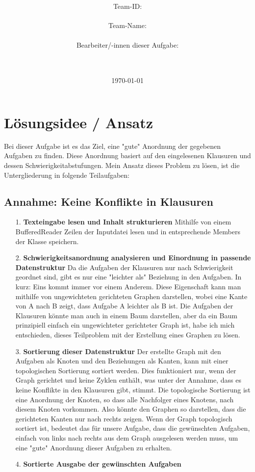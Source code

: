 \documentclass[a4paper,10pt,ngerman]{scrartcl}
\title{\textbf{\Huge\Aufgabe}}
\author{\LARGE Team-ID: \LARGE \TeamId \\\\
	    \LARGE Team-Name: \LARGE \TeamName \\\\
	    \LARGE Bearbeiter/-innen dieser Aufgabe: \\ 
	    \LARGE \Namen\\\\}
\date{\LARGE\today}
\begin{document}
\maketitle
\tableofcontents

\vspace{0.5cm}

\section{Lösungsidee / Ansatz}

Bei dieser Aufgabe ist es das Ziel, eine "gute" Anordnung der gegebenen Aufgaben zu finden. Diese Anordnung basiert auf den eingelesenen
Klausuren und dessen Schwierigkeitabstufungen. Mein Ansatz dieses Problem zu lösen, ist die Untergliederung in folgende Teilaufgaben:

\subsection{Annahme: Keine Konflikte in Klausuren}

\begin{itemize}
  \item[1.] \textbf{Texteingabe lesen und Inhalt strukturieren}
  \newline
  Mithilfe von einem BufferedReader Zeilen der Inputdatei lesen und in entsprechende Members der Klasse speichern.
  \item[2.] \textbf{Schwierigkeitsanordnung analysieren und Einordnung in passende Datenstruktur}
  \newline
  Da die Aufgaben der Klausuren nur nach Schwierigkeit geordnet sind, gibt es nur eine "leichter als" Beziehung in den Aufgaben. In kurz: Eins kommt immer vor einem Anderem.
  Diese Eigenschaft kann man mithilfe von ungewichteten gerichteten Graphen darstellen, wobei eine Kante von A nach B zeigt, dass Aufgabe A leichter als B ist. Die Aufgaben der Klausuren könnte man auch in einem 
  Baum darstellen, aber da ein Baum prinzipiell einfach ein ungewichteter gerichteter Graph ist, habe ich mich entschieden, dieses Teilproblem mit der Erstellung eines Graphen zu lösen.
  \item[3.] \textbf{Sortierung dieser Datenstruktur}
  \newline
  Der erstellte Graph mit den Aufgaben als Knoten und den Beziehungen als Kanten, kann mit einer topologischen Sortierung sortiert werden. Dies funktioniert nur, wenn der Graph gerichtet und keine Zyklen enthält,
  was unter der Annahme, dass es keine Konflikte in den Klausuren gibt, stimmt. Die topologische Sortierung ist eine Anordnung der Knoten, so dass alle Nachfolger eines Knotens, nach diesem Knoten vorkommen. Also könnte
  den Graphen so darstellen, dass die gerichteten Kanten nur nach rechts zeigen. Wenn der Graph topologisch sortiert ist, bedeutet das für unsere Aufgabe, dass die gewünschten Aufgaben, einfach von links nach rechts
  aus dem Graph ausgelesen werden muss, um eine "gute" Anordnung dieser Aufgaben zu erhalten.
  \item[4.] \textbf{Sortierte Ausgabe der gewünschten Aufgaben}
\end{itemize}
\end{document}
